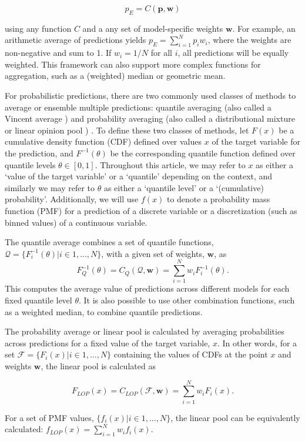 \documentclass[
  article,
  shortnames,
  notitle]{jss}
\begin{document}
\[
p_E = C(\pmb{p}, \pmb{w}) 
\]

using any function \(C\) and a any set of model-specific weights
\(\pmb{w}\). For example, an arithmetic average of predictions yields
\(p_E = \sum_{i=1}^Np_iw_i\), where the weights are non-negative and sum
to 1. If \(w_i = 1/N\) for all \(i\), all predictions will be equally
weighted. This framework can also support more complex functions for
aggregation, such as a (weighted) median or geometric mean.

For probabilistic predictions, there are two commonly used classes of
methods to average or ensemble multiple predictions: quantile averaging
(also called a Vincent average \citep{vincent1912}) and probability
averaging (also called a distributional mixture or linear opinion pool
\citep{stone1961}) \citep{lichtendahl2013}. To define these two classes
of methods, let \(F(x)\) be a cumulative density function (CDF) defined
over values \(x\) of the target variable for the prediction, and
\(F^{-1}(\theta)\) be the corresponding quantile function defined over
quantile levels \(\theta \in [0, 1]\). Throughout this article, we may
refer to \(x\) as either a `value of the target variable' or a
`quantile' depending on the context, and similarly we may refer to
\(\theta\) as either a `quantile level' or a `(cumulative) probability'.
Additionally, we will use \(f(x)\) to denote a probability mass function
(PMF) for a prediction of a discrete variable or a discretization (such
as binned values) of a continuous variable.

The quantile average combines a set of quantile functions,
\(\mathcal{Q} = \{F_i^{-1}(\theta)| i \in 1,...,N \}\), with a given set
of weights, \(\pmb{w}\), as \[
F^{-1}_Q(\theta) = C_Q(\mathcal{Q}, \pmb{w}) = \sum_{i = 1}^Nw_iF^{-1}_i(\theta).
\]This computes the average value of predictions across different models
for each fixed quantile level \(\theta\). It is also possible to use
other combination functions, such as a weighted median, to combine
quantile predictions.

The probability average or linear pool is calculated by averaging
probabilities across predictions for a fixed value of the target
variable, \(x\). In other words, for a set
\(\mathcal{F} = \{F_i(x)| i \in 1,...,N \}\) containing the values of
CDFs at the point \(x\) and weights \(\pmb{w}\), the linear pool is
calculated as

\[
F_{LOP}(x) = C_{LOP}(\mathcal{F}, \pmb{w}) = \sum_{i = 1}^Nw_iF_i(x). 
\]

For a set of PMF values, \(\{f_i(x)|i \in 1, ..., N\}\), the linear pool
can be equivalently calculated:
\(f_{LOP}(x) = \sum_{i = 1}^N w_i f_i(x)\).
\end{document}
